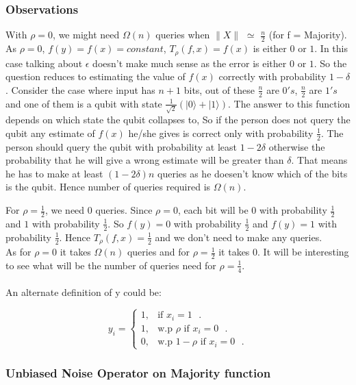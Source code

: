 \documentclass[11pt]{article}
\begin{document}
\subsubsection{Observations}
\BP With $\rho = 0$, we might need $\Omega(n)$ queries when $\|X\|$ $\simeq$ $\frac{n}{2}$  (for f = Majority).\EP
\BPF
As $\rho=0$, $f(y) = f(x) = constant$,  $T_{\rho}(f,x) = f(x)$ is either $0$ or $1$. In this case talking about $\epsilon$ doesn't make much sense as the error is either $0$ or $1$. So the question reduces to estimating the value of $f(x)$ correctly with probability $1-\delta$. Consider the case where input has $n+1$ bits, out of these $\frac{n}{2}$ are $0's$, $\frac{n}{2}$ are $1's$ and one of them is a qubit with state $\frac{1}{\sqrt{2}}(|0\rangle + |1\rangle)$. The answer to this function depends on which state the qubit collapses to, So if the person does not query the qubit any estimate of $f(x)$ he/she gives is correct only with probability $\frac{1}{2}$. The person should query the qubit with probability at least $1-2\delta$ otherwise the probability that he will give a wrong estimate will be greater than $\delta$. That means he has to make at least $(1-2\delta)n$ queries as he doesen't know which of the bits is the qubit. Hence number of queries required is $\Omega(n)$.
 \EPF

\BP For $\rho= \frac{1}{2}$, we need 0 queries. \EP
\BPF
Since $\rho = 0$, each bit will be $0$ with probability $\frac{1}{2}$ and $1$ with probability $\frac{1}{2}$. So $f(y)=0$ with probability $\frac{1}{2}$ and $f(y)=1$ with probability $\frac{1}{2}$. Hence $T_{\rho}(f,x)= \frac{1}{2}$ and we don't need to make any queries. 
\EPF \\

 \noindent
As for $\rho = 0$ it takes $\Omega (n)$ queries and for $\rho = \frac{1}{2}$ it takes 0. It will be interesting to see what will be the number of queries need for $\rho = \frac{1}{4}$. \\\\
\noindent
An alternate definition of y could be:

\begin{equation}
y_i  =\begin{cases}
1 , & \text{if $x_i = 1$ }.\\
1 , & \text{w.p $\rho$ if $x_i = 0$ }.\\
0 , & \text{w.p $1- \rho$ if $x_i = 0$ }.
\end{cases}
\end{equation}

\subsubsection{Unbiased Noise Operator on Majority function}
\end{document}
